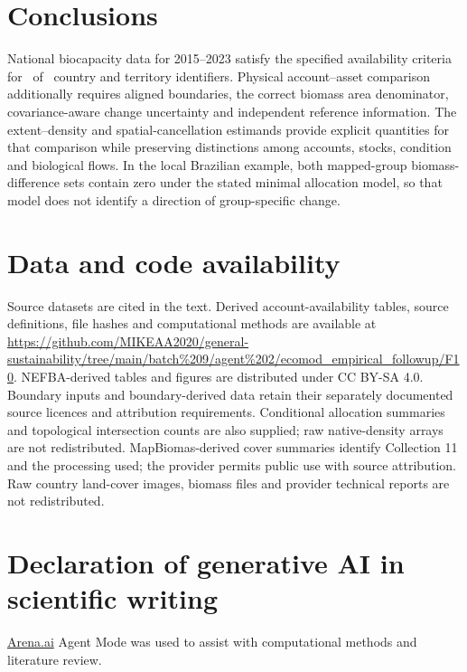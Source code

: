 \documentclass[11pt,a4paper]{article}
\begin{document}
\section{Conclusions}
National biocapacity data for 2015--2023 satisfy the specified availability criteria for \AccountPass\ of \CountryIDs\ country and territory identifiers. Physical account--asset comparison additionally requires aligned boundaries, the correct biomass area denominator, covariance-aware change uncertainty and independent reference information. The extent--density and spatial-cancellation estimands provide explicit quantities for that comparison while preserving distinctions among accounts, stocks, condition and biological flows. In the local Brazilian example, both mapped-group biomass-difference sets contain zero under the stated minimal allocation model, so that model does not identify a direction of group-specific change.

\section*{Data and code availability}
Source datasets are cited in the text. Derived account-availability tables, source definitions, file hashes and computational methods are available at \url{https://github.com/MIKEAA2020/general-sustainability/tree/main/batch%209/agent%202/ecomod_empirical_followup/F10}. NEFBA-derived tables and figures are distributed under CC BY-SA 4.0. Boundary inputs and boundary-derived data retain their separately documented source licences and attribution requirements. Conditional allocation summaries and topological intersection counts are also supplied; raw native-density arrays are not redistributed. MapBiomas-derived cover summaries identify Collection 11 and the processing used; the provider permits public use with source attribution. Raw country land-cover images, biomass files and provider technical reports are not redistributed.

\section*{Declaration of generative AI in scientific writing}
\href{http://Arena.ai}{Arena.ai} Agent Mode was used to assist with computational methods and literature review.
\end{document}
